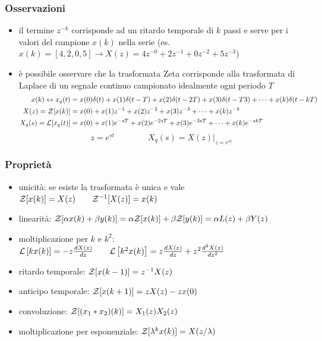 \subsubsection*{Osservazioni}
\begin{itemize}
	\item il termine \(z^{-k}\) corrisponde ad un ritardo temporale di \(k\) passi e serve per  i valori del campione
	\(x(k)\) nella serie (es. \(x(k)=[4,2,0,5] \rightarrow X(z) = 4z^{-0} + 2z^{-1} + 0z^{-2} + 5z^{-3}\))
	\item è possibile osservare che la trasformata Zeta corrisponde alla trasformata di Laplace di un segnale continuo campionato
	idealmente ogni periodo \(T\)
	\begin{align*}
		x(k) \leftrightarrow x_q(t) &= x(0)\delta(t) + x(1)\delta(t-T) + x(2)\delta(t-2T) + x(3)\delta(t-T3) + \dots + x(k)\delta(t-kT) \\
		X(z) = \mathcal{Z}[x(k)] &= x(0) + x(1)z^{-1} + x(2)z^{-2} + x(3)z^{-3} + \dots + x(k)z^{-k} \\
		X_q(s) = \mathcal{L}[x_q(t)] &= x(0) + x(1)e^{-sT} + x(2)e^{-2sT} + x(3)e^{-3sT} + \dots + x(k)e^{-skT}
	\end{align*}
	\[z = e^{st} \qquad\qquad X_q(s) = \left. X(z) \right|_{z = e^{st}}\]
\end{itemize}

\subsubsection*{Proprietà}
\begin{itemize}
	\item unicità: se esiste la trasformata è unica e vale \(\mathcal{Z}[x(k)] = X(z) \qquad \mathcal{Z}^{-1}[X(z)] = x(k)\)
	\item linearità: \(\mathcal{Z}[\alpha x(k) + \beta y(k)] = \alpha\mathcal{Z}[x(k)] + \beta\mathcal{Z}[y(k)] = \alpha L(z) + \beta Y(z)\)
	\item moltiplicazione per \(k\) e \(k^2\): \(\mathcal{L}\left[kx(k)\right] = -z\frac{dX(z)}{dz} \qquad \mathcal{L}\left[k^2 x(k)\right] = z\frac{dX(z)}{dz} + z^2\frac{d^2X(z)}{dz^2}\)
	\item ritardo temporale: \(\mathcal{Z}[x(k-1)] = z^{-1} X(z)\)
	\item anticipo temporale: \(\mathcal{Z}[x(k+1)] = zX(z)- zx(0)\)
	\item convoluzione: \(\mathcal{Z}[(x_1*x_2)(k)] = X_1(z)X_2(z)\)
	\item moltiplicazione per esponenziale: \(\mathcal{Z}[\lambda^kx(k)] = X(z/\lambda)\)
\end{itemize}

